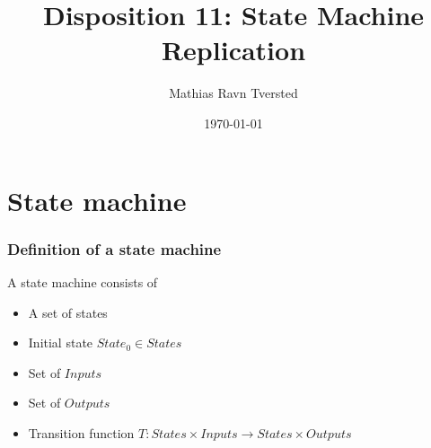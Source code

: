 \documentclass[14pt]{beamer}
\title{Disposition 11: State Machine Replication}
\author{Mathias Ravn Tversted}
\date{\today}
\begin{document}
\frame{\titlepage} 



\section{State machine}
        \begin{frame}
            \frametitle{Definition of a state machine}
                A state machine consists of 
                \begin{itemize}
                    \item A set of states
                    \item Initial state $State_0 \in States$
                    \item Set of $Inputs$
                    \item Set of $Outputs$
                    \item Transition function $T: States \times Inputs \rightarrow States \times Outputs$
                \end{itemize}
        \end{frame}
\end{document}

